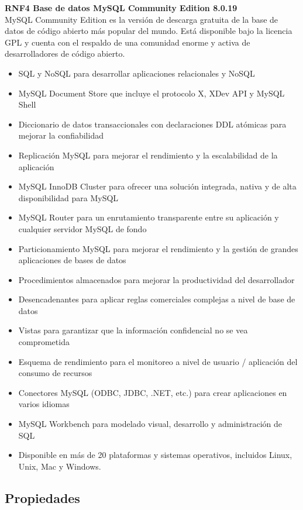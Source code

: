 \textbf{RNF4 \hspace{1cm}Base de datos MySQL Community Edition 8.0.19}\\
MySQL Community Edition es la versión de descarga gratuita de la base de datos de código abierto más popular del mundo. Está disponible bajo la licencia GPL y cuenta con el respaldo de una comunidad enorme y activa de desarrolladores de código abierto.
\begin{itemize}
	\item SQL y NoSQL para desarrollar aplicaciones relacionales y NoSQL
	\item MySQL Document Store que incluye el protocolo X, XDev API y MySQL Shell
	\item Diccionario de datos transaccionales con declaraciones DDL atómicas para mejorar la confiabilidad
	\item Replicación MySQL para mejorar el rendimiento y la escalabilidad de la aplicación
	\item MySQL InnoDB Cluster para ofrecer una solución integrada, nativa y de alta disponibilidad para MySQL
	\item MySQL Router para un enrutamiento transparente entre su aplicación y cualquier servidor MySQL de fondo
	\item Particionamiento MySQL para mejorar el rendimiento y la gestión de grandes aplicaciones de bases de datos
	\item Procedimientos almacenados para mejorar la productividad del desarrollador
	\item Desencadenantes para aplicar reglas comerciales complejas a nivel de base de datos
	\item Vistas para garantizar que la información confidencial no se vea comprometida
	\item Esquema de rendimiento para el monitoreo a nivel de usuario / aplicación del consumo de recursos
	\item Conectores MySQL (ODBC, JDBC, .NET, etc.) para crear aplicaciones en varios idiomas
	\item MySQL Workbench para modelado visual, desarrollo y administración de SQL
	\item Disponible en más de 20 plataformas y sistemas operativos, incluidos Linux, Unix, Mac y Windows.
\end{itemize}

\subsection{Propiedades}

